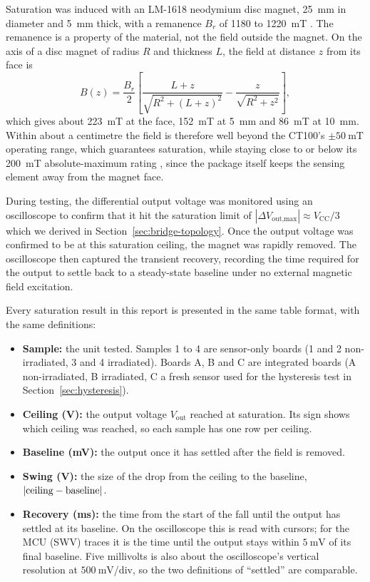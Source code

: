 \documentclass[12pt,a4paper]{article}
\begin{document}
Saturation was induced with an LM-1618 neodymium disc magnet, \SI{25}{\milli\metre} in diameter and \SI{5}{\milli\metre} thick, with a remanence $B_r$ of 1180 to \SI{1220}{\milli\tesla} \cite{lm1618_datasheet}. The remanence is a property of the material, not the field outside the magnet. On the axis of a disc magnet of radius $R$ and thickness $L$, the field at distance $z$ from its face is
\begin{equation}
B(z) = \frac{B_r}{2}\left[\frac{L+z}{\sqrt{R^2+(L+z)^2}} - \frac{z}{\sqrt{R^2+z^2}}\right],
\label{eq:disc-magnet}
\end{equation}
which gives about \SI{223}{\milli\tesla} at the face, \SI{152}{\milli\tesla} at \SI{5}{\milli\metre} and \SI{86}{\milli\tesla} at \SI{10}{\milli\metre}. Within about a centimetre the field is therefore well beyond the CT100's $\pm\SI{50}{\milli\tesla}$ operating range, which guarantees saturation, while staying close to or below its \SI{200}{\milli\tesla} absolute-maximum rating \cite{ct100_datasheet}, since the package itself keeps the sensing element away from the magnet face.

During testing, the differential output voltage was monitored using an oscilloscope to confirm that it hit the saturation limit of \(\left| \Delta V_{\text{out,max}} \right| \approx V_{\text{CC}} / 3\) which we derived in Section~\ref{sec:bridge-topology}. Once the output voltage was confirmed to be at this saturation ceiling, the magnet was rapidly removed. The oscilloscope then captured the transient recovery, recording the time required for the output to settle back to a steady-state baseline under no external magnetic field excitation.

Every saturation result in this report is presented in the same table format, with the same definitions:
\begin{itemize}
\item \textbf{Sample:} the unit tested. Samples 1 to 4 are sensor-only boards (1 and 2 non-irradiated, 3 and 4 irradiated). Boards A, B and C are integrated boards (A non-irradiated, B irradiated, C a fresh sensor used for the hysteresis test in Section~\ref{sec:hysteresis}).
\item \textbf{Ceiling (V):} the output voltage $V_{\text{out}}$ reached at saturation. Its sign shows which ceiling was reached, so each sample has one row per ceiling.
\item \textbf{Baseline (mV):} the output once it has settled after the field is removed.
\item \textbf{Swing (V):} the size of the drop from the ceiling to the baseline, $|{\rm ceiling} - {\rm baseline}|$.
\item \textbf{Recovery (ms):} the time from the start of the fall until the output has settled at its baseline. On the oscilloscope this is read with cursors; for the MCU (SWV) traces it is the time until the output stays within $\SI{5}{\milli\volt}$ of its final baseline. Five millivolts is also about the oscilloscope's vertical resolution at $\SI{500}{\milli\volt}$/div, so the two definitions of ``settled'' are comparable.
\end{itemize}
\end{document}
